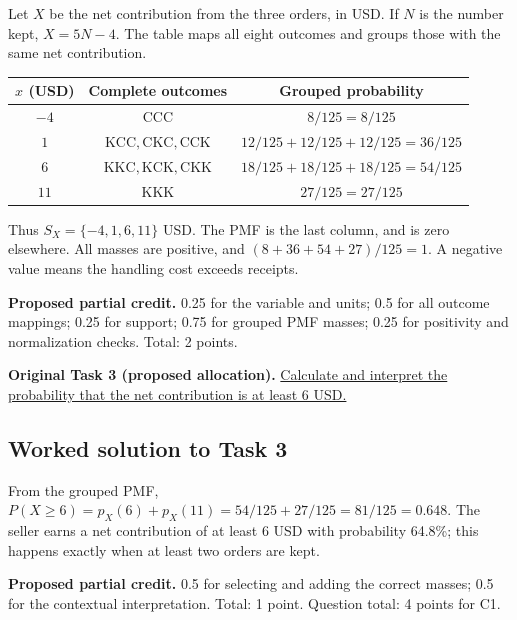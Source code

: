 Let $X$ be the net contribution from the three orders, in USD. If $N$ is the number kept, $X=5N-4$. The table maps all eight outcomes and groups those with the same net contribution.

\begin{center}
\begin{tabular}{ccc}\toprule
$x$ (USD) & Complete outcomes & Grouped probability\\\midrule
$-4$ & $\mathrm{CCC}$ & $8/125=8/125$\\
$1$ & $\mathrm{KCC},\mathrm{CKC},\mathrm{CCK}$ & $12/125+12/125+12/125=36/125$\\
$6$ & $\mathrm{KKC},\mathrm{KCK},\mathrm{CKK}$ & $18/125+18/125+18/125=54/125$\\
$11$ & $\mathrm{KKK}$ & $27/125=27/125$\\
\bottomrule\end{tabular}
\end{center}


Thus $S_X=\{-4,1,6,11\}$ USD. The PMF is the last column, and is zero elsewhere. All masses are positive, and $(8+36+54+27)/125=1$. A negative value means the handling cost exceeds receipts.

\textbf{Proposed partial credit.} 0.25 for the variable and units; 0.5 for all outcome mappings; 0.25 for support; 0.75 for grouped PMF masses; 0.25 for positivity and normalization checks. Total: 2 points.

\par\vspace{3mm}\secInicio[][sec:q1]

\textbf{Original Task 3 (proposed allocation).} \hyperref[sol:q1t3]{Calculate and interpret the probability that the net contribution is at least 6 USD.} 


\subsection*{Worked solution to Task 3 }
\label{sol:q1t3}

From the grouped PMF, $P(X\geq6)=p_X(6)+p_X(11)=54/125+27/125=81/125=0.648$. The seller earns a net contribution of at least 6 USD with probability 64.8\%; this happens exactly when at least two orders are kept.

\textbf{Proposed partial credit.} 0.5 for selecting and adding the correct masses; 0.5 for the contextual interpretation. Total: 1 point. Question total: 4 points for C1.

\par\vspace{3mm}\secInicio[][sec:q1]

